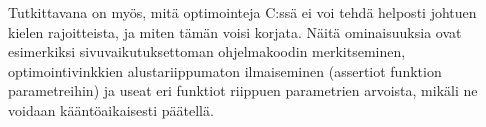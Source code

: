 \documentclass{article}
\begin{document}
Tutkittavana on myös, mitä optimointeja C:ssä ei voi tehdä helposti johtuen
kielen rajoitteista, ja miten tämän voisi korjata. Näitä ominaisuuksia ovat
esimerkiksi sivuvaikutuksettoman ohjelmakoodin merkitseminen,
optimointivinkkien alustariippumaton ilmaiseminen (assertiot funktion
parametreihin) ja useat eri funktiot riippuen parametrien arvoista, mikäli ne
voidaan kääntöaikaisesti päätellä.

\nocite{ADA12}
\nocite{C11}
\nocite{CPP14}
\nocite{D}
\nocite{golang}



\end{document}
